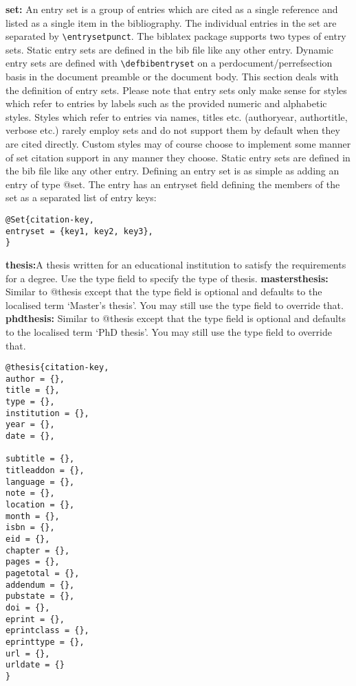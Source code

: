 \documentclass{article}
\begin{document}
\begin{multicols}{2}
\vspace{0.5cm}
\noindent \textbf{set:} An entry set is a group of entries which are cited as a single reference and listed as a single item in the bibliography. The individual entries in the set are separated by \verb|\entrysetpunct|. The biblatex package supports two types of entry sets. Static entry sets are defined in the bib file like any other entry. Dynamic entry sets are defined with \verb|\defbibentryset| on a perdocument/perrefsection basis in the document preamble or the document body. This section deals with the definition of entry sets. Please note that entry sets only make sense for styles which refer to entries by labels such as the provided numeric and alphabetic styles. Styles which refer to entries via names, titles etc. (authoryear, authortitle, verbose etc.) rarely employ sets and do not support them by default when they are cited directly. Custom styles may of course choose to implement some manner of set citation support in any manner they choose. Static entry sets are defined in the bib file like any other entry. Defining an entry set is as simple as adding an entry of type @set. The entry has an entryset field defining the members of the set as a separated list of entry keys:
\begin{verbatim}
@Set{citation-key,
entryset = {key1, key2, key3},
}
\end{verbatim}

\vspace{0.5cm}
\noindent \textbf{thesis:}A thesis written for an educational institution to satisfy the requirements for a degree. Use the type field to specify the type of thesis. \textbf{mastersthesis:} Similar to @thesis except that the type field is optional and defaults to the localised term ‘Master’s thesis’. You may still use the type field to override that. \textbf{phdthesis:} Similar to @thesis except that the type field is optional and defaults to the localised term ‘PhD thesis’. You may still use the type field to override that. 
\begin{verbatim}
@thesis{citation-key,
author = {},
title = {},
type = {},
institution = {},
year = {},
date = {},

subtitle = {},
titleaddon = {},
language = {},
note = {},
location = {},
month = {},
isbn = {},
eid = {}, 
chapter = {},
pages = {},
pagetotal = {}, 
addendum = {}, 
pubstate = {},
doi = {},
eprint = {},
eprintclass = {},
eprinttype = {},
url = {},
urldate = {}
}
\end{verbatim}


\end{multicols}
\end{document}
